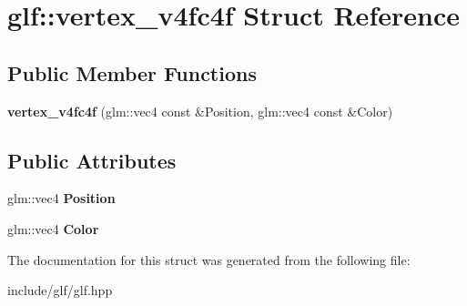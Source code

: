 \hypertarget{structglf_1_1vertex__v4fc4f}{\section{glf\-:\-:vertex\-\_\-v4fc4f \-Struct \-Reference}
\label{structglf_1_1vertex__v4fc4f}
}
\subsection*{\-Public \-Member \-Functions}
\begin{DoxyCompactItemize}
\item 
\hypertarget{structglf_1_1vertex__v4fc4f_a8d1aa704f980b20c598dbe0d1f07bcb0}{{\bfseries vertex\-\_\-v4fc4f} (glm\-::vec4 const \&\-Position, glm\-::vec4 const \&\-Color)}\label{structglf_1_1vertex__v4fc4f_a8d1aa704f980b20c598dbe0d1f07bcb0}

\end{DoxyCompactItemize}
\subsection*{\-Public \-Attributes}
\begin{DoxyCompactItemize}
\item 
\hypertarget{structglf_1_1vertex__v4fc4f_a1d31cdbd360c5a2ddf773dc45b0bdcf1}{glm\-::vec4 {\bfseries \-Position}}\label{structglf_1_1vertex__v4fc4f_a1d31cdbd360c5a2ddf773dc45b0bdcf1}

\item 
\hypertarget{structglf_1_1vertex__v4fc4f_a632f1c37065f2b6ed09330d1489bb6c7}{glm\-::vec4 {\bfseries \-Color}}\label{structglf_1_1vertex__v4fc4f_a632f1c37065f2b6ed09330d1489bb6c7}

\end{DoxyCompactItemize}


\-The documentation for this struct was generated from the following file\-:\begin{DoxyCompactItemize}
\item 
include/glf/glf.\-hpp\end{DoxyCompactItemize}

